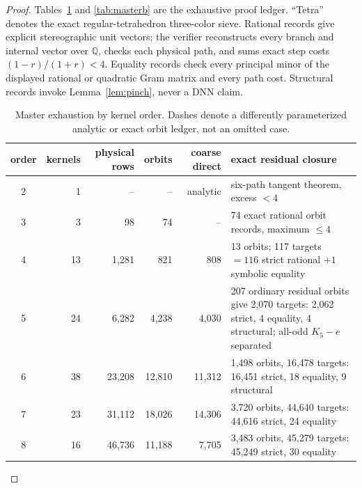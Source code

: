 \documentclass[11pt]{article}
\theoremstyle{remark}
\begin{document}
\begin{proof}
Tables~\ref{tab:mastera} and \ref{tab:masterb} are the exhaustive proof ledger.
``Tetra'' denotes the exact regular-tetrahedron three-color sieve.  Rational
records give explicit stereographic unit vectors; the verifier reconstructs
every branch and internal vector over $\mathbb Q$, checks each physical path,
and sums exact step costs $(1-r)/(1+r)<4$.  Equality records check every
principal minor of the displayed rational or quadratic Gram matrix and every
path cost.  Structural records invoke Lemma~\ref{lem:pinch}, never a DNN claim.

\begin{table}[p]
\centering\small
\begin{tabular}{crrrrp{4.2cm}}
\toprule
order&kernels&physical rows&orbits&coarse direct&exact residual closure\\\midrule
2&1&--&--&analytic&six-path tangent theorem, excess $<4$\\
3&3&98&74&--&74 exact rational orbit records, maximum $\le4$\\
4&13&1,281&821&808&13 orbits; 117 targets $=116$ strict rational $+1$ symbolic equality\\
5&24&6,282&4,238&4,030&207 ordinary residual orbits give 2,070 targets: 2,062 strict, 4 equality, 4 structural; all-odd $K_5-e$ separated\\
6&38&23,208&12,810&11,312&1,498 orbits, 16,478 targets: 16,451 strict, 18 equality, 9 structural\\
7&23&31,112&18,026&14,306&3,720 orbits, 44,640 targets: 44,616 strict, 24 equality\\
8&16&46,736&11,188&7,705&3,483 orbits, 45,279 targets: 45,249 strict, 30 equality\\
\bottomrule
\end{tabular}
\caption{Master exhaustion by kernel order.  Dashes denote a differently
parameterized analytic or exact orbit ledger, not an omitted case.}\label{tab:mastera}
\end{table}


\end{proof}
\end{document}
